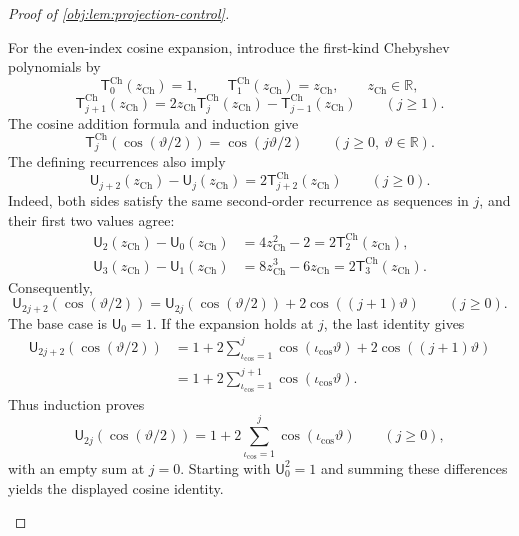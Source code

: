 \documentclass[11pt]{article}
\begin{document}
\begin{proof}[Proof of \cref{obj:lem:projection-control}]
\begin{enumerate}
For the even-index cosine expansion, introduce the first-kind Chebyshev polynomials by
\[
\mathsf T^{\mathrm{Ch}}_0(z_{\mathrm{Ch}})=1,
\qquad
\mathsf T^{\mathrm{Ch}}_1(z_{\mathrm{Ch}})=z_{\mathrm{Ch}},
\qquad z_{\mathrm{Ch}}\in\mathbb R,
\]
\[
\mathsf T^{\mathrm{Ch}}_{j+1}(z_{\mathrm{Ch}})
=2z_{\mathrm{Ch}}\mathsf T^{\mathrm{Ch}}_j(z_{\mathrm{Ch}})
 -\mathsf T^{\mathrm{Ch}}_{j-1}(z_{\mathrm{Ch}})
\qquad(j\ge1).
\]
The cosine addition formula and induction give
\[
\mathsf T^{\mathrm{Ch}}_j(\cos(\vartheta/2))
=\cos(j\vartheta/2)
\qquad(j\ge0,\ \vartheta\in\mathbb R).
\]
The defining recurrences also imply
\[
\mathsf U_{j+2}(z_{\mathrm{Ch}})-\mathsf U_j(z_{\mathrm{Ch}})
=2\mathsf T^{\mathrm{Ch}}_{j+2}(z_{\mathrm{Ch}})
\qquad(j\ge0).
\]
Indeed, both sides satisfy the same second-order recurrence as sequences in \(j\), and their first two values agree:
\[
\begin{aligned}
\mathsf U_2(z_{\mathrm{Ch}})-\mathsf U_0(z_{\mathrm{Ch}})
&=4z_{\mathrm{Ch}}^2-2
 =2\mathsf T^{\mathrm{Ch}}_2(z_{\mathrm{Ch}}),\\
\mathsf U_3(z_{\mathrm{Ch}})-\mathsf U_1(z_{\mathrm{Ch}})
&=8z_{\mathrm{Ch}}^3-6z_{\mathrm{Ch}}
 =2\mathsf T^{\mathrm{Ch}}_3(z_{\mathrm{Ch}}).
\end{aligned}
\]
Consequently,
\[
\mathsf U_{2j+2}(\cos(\vartheta/2))
=\mathsf U_{2j}(\cos(\vartheta/2))
 +2\cos((j+1)\vartheta)
\qquad(j\ge0).
\]
The base case is \(\mathsf U_0=1\). If the expansion holds at \(j\), the last identity gives
\[
\begin{aligned}
\mathsf U_{2j+2}(\cos(\vartheta/2))
&=1+2\sum_{\iota_{\mathrm{cos}}=1}^{j}
 \cos(\iota_{\mathrm{cos}}\vartheta)
 +2\cos((j+1)\vartheta)\\
&=1+2\sum_{\iota_{\mathrm{cos}}=1}^{j+1}
 \cos(\iota_{\mathrm{cos}}\vartheta).
\end{aligned}
\]
Thus induction proves
\[
\mathsf U_{2j}(\cos(\vartheta/2))
=1+2\sum_{\iota_{\mathrm{cos}}=1}^{j}
 \cos(\iota_{\mathrm{cos}}\vartheta)
\qquad(j\ge0),
\]
with an empty sum at \(j=0\).
Starting with \(\mathsf U_0^2=1\) and summing these differences yields the displayed cosine identity.


\end{enumerate}
\end{proof}
\end{document}
